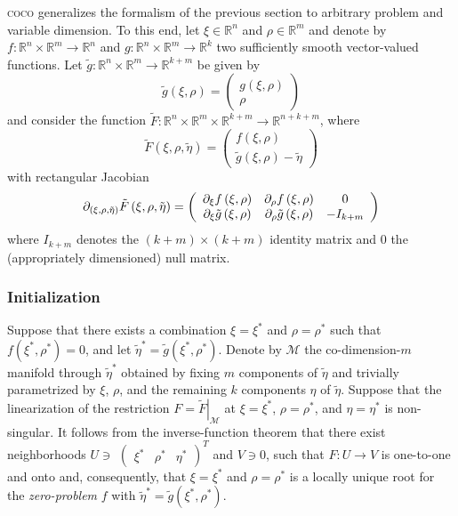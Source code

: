 \documentclass{article}
\begin{document}
\textsc{coco} generalizes the formalism of the previous section to arbitrary
problem and variable dimension. To this end, let $\xi \in \mathbb{R}^{n}$
and $\rho \in \mathbb{R}^{m}$ and denote by $f:\mathbb{R}^{n}\times \mathbb{R%
}^{m}\rightarrow \mathbb{R}^{n}$ and $g:\mathbb{R}^{n}\times \mathbb{R}%
^{m}\rightarrow \mathbb{R}^{k}$ two sufficiently smooth vector-valued
functions. Let $\tilde{g}:\mathbb{R}^{n}\times \mathbb{R}^{m}\rightarrow 
\mathbb{R}^{k+m}$ be given by%
\[
\tilde{g}\left( \xi ,\rho \right) =\left( 
\begin{array}{c}
g\left( \xi ,\rho \right)  \\ 
\rho 
\end{array}%
\right) 
\]%
and consider the function $\tilde{F}:\mathbb{R}^{n}\times \mathbb{R}%
^{m}\times \mathbb{R}^{k+m}\rightarrow \mathbb{R}^{n+k+m}$, where%
\[
\tilde{F}\left( \xi ,\rho ,\tilde{\eta}\right) =\left( 
\begin{array}{c}
f\left( \xi ,\rho \right)  \\ 
\tilde{g}\left( \xi ,\rho \right) -\tilde{\eta}%
\end{array}%
\right) 
\]%
with rectangular Jacobian%
\[
\partial _{\left( \xi ,\rho ,\tilde{\eta}\right) }\tilde{F}\left( \xi ,\rho ,%
\tilde{\eta}\right) =\left( 
\begin{array}{ccc}
\partial _{\xi }f\left( \xi ,\rho \right)  & \partial _{\rho }f\left( \xi
,\rho \right)  & 0 \\ 
\partial _{\xi }\tilde{g}\left( \xi ,\rho \right)  & \partial _{\rho }\tilde{%
g}\left( \xi ,\rho \right)  & -I_{k+m}%
\end{array}%
\right) 
\]%
where $I_{k+m}$ denotes the $\left( k+m\right) \times \left( k+m\right) $
identity matrix and $0$ the (appropriately dimensioned) null matrix.

\subsubsection{Initialization}

Suppose that there exists a combination $\xi =\xi ^{\ast }$ and $\rho =\rho
^{\ast }$ such that $f\left( \xi ^{\ast },\rho ^{\ast }\right) =0$, and let $%
\tilde{\eta}^{\ast }=\tilde{g}\left( \xi ^{\ast },\rho ^{\ast }\right) $.
Denote by $\mathcal{M}$ the co-dimension-$m$ manifold through $\tilde{\eta}^{\ast }$ obtained by fixing $m$ components of $\tilde{\eta}$ and trivially
parametrized by $\xi $, $\rho $, and the remaining $k$ components $\eta $ of 
$\tilde{\eta}$. Suppose that the linearization of the restriction $F=\left. 
\tilde{F}\right| _{\mathcal{M}}$ at $\xi =\xi ^{\ast }$, $\rho =\rho ^{\ast
} $, and $\eta =\eta ^{\ast }$ is non-singular. It follows from the
inverse-function theorem that there exist neighborhoods $U\ni $ $\left( 
\begin{array}{ccc}
\xi ^{\ast } & \rho ^{\ast } & \eta ^{\ast }
\end{array}
\right) ^{T}$ and $V\ni 0$, such that $F:U\rightarrow V$ is one-to-one and
onto and, consequently, that $\xi =\xi ^{\ast }$ and $\rho =\rho ^{\ast }$
is a locally unique root for the \emph{zero-problem} $f$ with $\tilde{\eta}
^{\ast }=\tilde{g}\left( \xi ^{\ast },\rho ^{\ast }\right) $.
\end{document}
